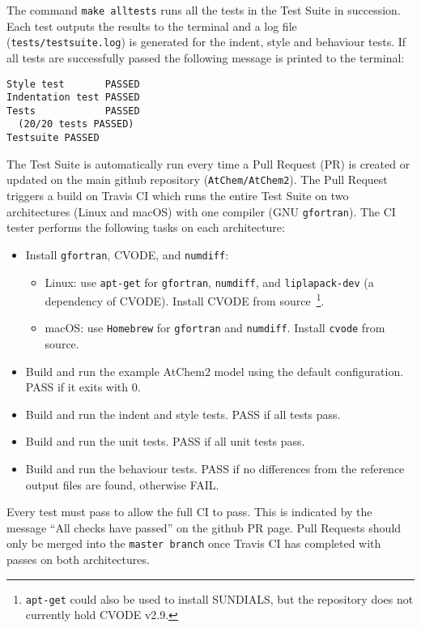 The command \verb|make alltests| runs all the tests in the Test Suite
in succession. Each test outputs the results to the terminal and a log
file (\texttt{tests/testsuite.log}) is generated for the indent, style
and behaviour tests. If all tests are successfully passed the
following message is printed to the terminal:

\begin{verbatim}
Style test       PASSED
Indentation test PASSED
Tests            PASSED
  (20/20 tests PASSED)
Testsuite PASSED
\end{verbatim}

The Test Suite is automatically run every time a Pull Request (PR) is
created or updated on the main github repository (\texttt{AtChem/AtChem2}).
The Pull Request triggers a build on Travis CI which runs the entire
Test Suite on two architectures (Linux and macOS) with one compiler
(GNU \texttt{gfortran}). The CI tester performs the following tasks on
each architecture:

\begin{itemize}
\item Install \texttt{gfortran}, CVODE, and \texttt{numdiff}:
  \begin{itemize}
  \item Linux: use \texttt{apt-get} for \texttt{gfortran},
    \texttt{numdiff}, and \texttt{liplapack-dev} (a dependency of
    CVODE). Install CVODE from source~\footnote{\texttt{apt-get} could
      also be used to install SUNDIALS, but the repository does not
      currently hold CVODE v2.9.}.
  \item macOS: use \texttt{Homebrew} for \texttt{gfortran} and
    \texttt{numdiff}. Install \texttt{cvode} from source.
  \end{itemize}
\item Build and run the example AtChem2 model using the default
  configuration. PASS if it exits with 0.
\item Build and run the indent and style tests. PASS if all tests pass.
\item Build and run the unit tests. PASS if all unit tests pass.
\item Build and run the behaviour tests. PASS if no differences from
  the reference output files are found, otherwise FAIL.
\end{itemize}

Every test must pass to allow the full CI to pass. This is indicated
by the message ``All checks have passed'' on the github PR page. Pull
Requests should only be merged into the \texttt{master\ branch} once
Travis CI has completed with passes on both architectures.

